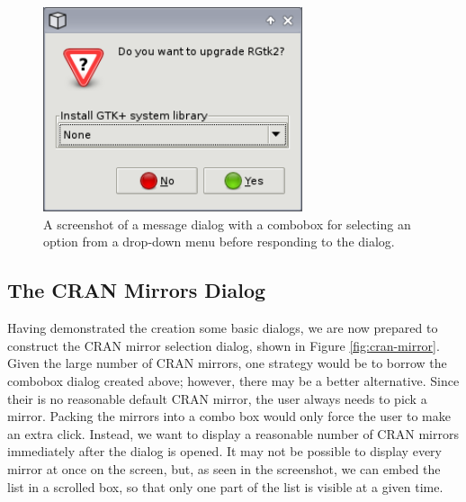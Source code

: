 \documentclass[article]{jss}
\begin{document}
\begin{figure}
\begin{center}
\includegraphics[width=3in]{combo-dialog.png}
\caption{\label{fig:combo-dialog}A screenshot of a message dialog with
a 
combobox for selecting an option from a drop-down menu before
responding to
the dialog.}
\end{center}
\end{figure}

\subsection{The CRAN Mirrors Dialog}

Having demonstrated the creation some basic dialogs, we are now
prepared to 
construct the CRAN mirror selection dialog, shown
in Figure \ref{fig:cran-mirror}.
Given the large number of CRAN mirrors, one strategy would be to 
borrow the combobox dialog created above; however, there may be a
better 
alternative. Since their is no reasonable default CRAN mirror, the
user always
needs to pick a mirror. Packing the mirrors into a combo box would
only force 
the user to make an extra click. Instead, we want to display a
reasonable
number of CRAN mirrors immediately after the dialog is opened. It may
not be possible to display every mirror at once on the screen, but, as
seen
in the screenshot, we can embed the list in a scrolled box, so that
only
one part of the list is visible at a given time.
\end{document}
